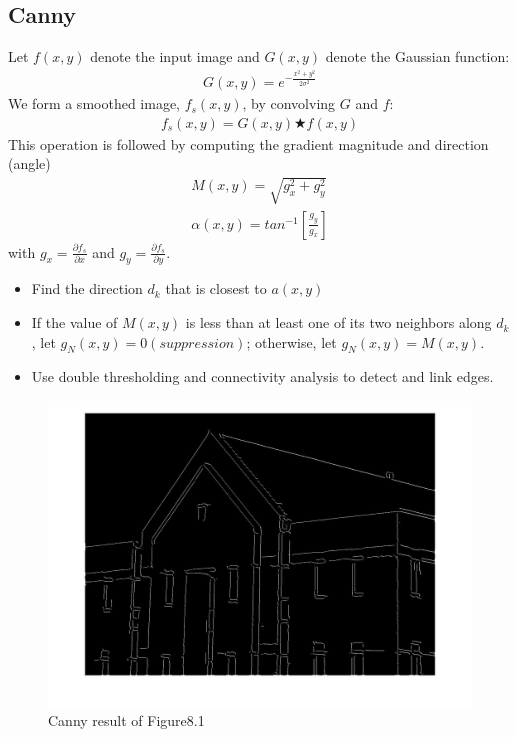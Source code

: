 \documentclass[11pt,oneside]{book}
\begin{document}
\subsection{Canny}
Let $f(x, y)$ denote the input image and $G(x, y)$ denote the Gaussian function:
\begin{align}
G(x,y) = e^{-\frac{x^2+y^2}{2\sigma ^2}}
\end{align}
We form a smoothed image, $f_s (x, y)$, by convolving $G$ and $f$:
\begin{align}
  f_s(x,y)=G(x,y)\bigstar f(x,y)
\end{align}
This operation is followed by computing the gradient magnitude and direction (angle)
\begin{align}
M(x,y) = \sqrt{g_x^2+g_y^2}\\
\alpha (x,y)=tan^{-1}[\frac{g_y}{g_x}]
\end{align}
with $g_x = \frac{\partial f_s}{ \partial x}$ and $g_y = \frac{\partial f_s}{ \partial y}$.
\begin{itemize}
  \item Find the direction $d_k$ that is closest to $a(x, y)$
  \item If the value of $M(x, y)$ is less than at least one of its two neighbors along $d_k$ , let $g_N (x, y) = 0 (suppression)$; otherwise, let $g_N (x, y) = M(x, y)$.
  \item Use double thresholding and connectivity analysis to detect and link edges.
\end{itemize}
\newpage
\begin{figure}[!htb]
   \centering  
   \includegraphics[width=1\textwidth]{images/9/canny.jpg}
   \caption{Canny result of Figure8.1}
\end{figure}
\end{document}
